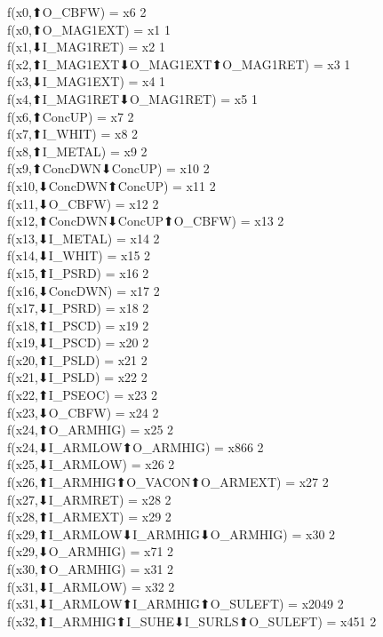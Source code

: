 f(x0,⬆O_CBFW) = x6 {2} \\
f(x0,⬆O_MAG1EXT) = x1 {1} \\
f(x1,⬇I_MAG1RET) = x2 {1} \\
f(x2,⬆I_MAG1EXT⬇O_MAG1EXT⬆O_MAG1RET) = x3 {1} \\
f(x3,⬇I_MAG1EXT) = x4 {1} \\
f(x4,⬆I_MAG1RET⬇O_MAG1RET) = x5 {1} \\
f(x6,⬆ConcUP) = x7 {2} \\
f(x7,⬆I_WHIT) = x8 {2} \\
f(x8,⬆I_METAL) = x9 {2} \\
f(x9,⬆ConcDWN⬇ConcUP) = x10 {2} \\
f(x10,⬇ConcDWN⬆ConcUP) = x11 {2} \\
f(x11,⬇O_CBFW) = x12 {2} \\
f(x12,⬆ConcDWN⬇ConcUP⬆O_CBFW) = x13 {2} \\
f(x13,⬇I_METAL) = x14 {2} \\
f(x14,⬇I_WHIT) = x15 {2} \\
f(x15,⬆I_PSRD) = x16 {2} \\
f(x16,⬇ConcDWN) = x17 {2} \\
f(x17,⬇I_PSRD) = x18 {2} \\
f(x18,⬆I_PSCD) = x19 {2} \\
f(x19,⬇I_PSCD) = x20 {2} \\
f(x20,⬆I_PSLD) = x21 {2} \\
f(x21,⬇I_PSLD) = x22 {2} \\
f(x22,⬆I_PSEOC) = x23 {2} \\
f(x23,⬇O_CBFW) = x24 {2} \\
f(x24,⬆O_ARMHIG) = x25 {2} \\
f(x24,⬇I_ARMLOW⬆O_ARMHIG) = x866 {2} \\
f(x25,⬇I_ARMLOW) = x26 {2} \\
f(x26,⬆I_ARMHIG⬆O_VACON⬆O_ARMEXT) = x27 {2} \\
f(x27,⬇I_ARMRET) = x28 {2} \\
f(x28,⬆I_ARMEXT) = x29 {2} \\
f(x29,⬆I_ARMLOW⬇I_ARMHIG⬇O_ARMHIG) = x30 {2} \\
f(x29,⬇O_ARMHIG) = x71 {2} \\
f(x30,⬆O_ARMHIG) = x31 {2} \\
f(x31,⬇I_ARMLOW) = x32 {2} \\
f(x31,⬇I_ARMLOW⬆I_ARMHIG⬆O_SULEFT) = x2049 {2} \\
f(x32,⬆I_ARMHIG⬆I_SUHE⬇I_SURLS⬆O_SULEFT) = x451 {2} \\
